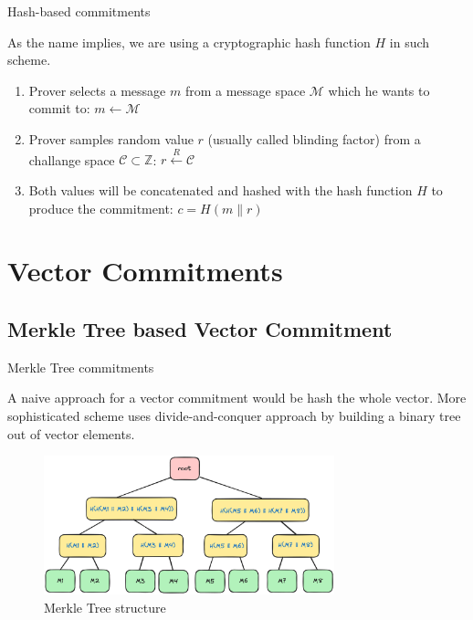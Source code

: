 \documentclass{zkdl-presentation-template}
\begin{document}
    \begin{frame}{Hash-based commitments}

        As the name implies, we are using a cryptographic hash function \(H\) in such scheme.

        \begin{definition}
            \begin{enumerate}
                \item Prover selects a message $m$ from a message space $\mathcal{M}$ which he wants to commit to:
                    $m \leftarrow \mathcal{M}$
            
                \item Prover samples random value $r$ (usually called blinding factor) from a challange space $\mathcal{C} \subset \mathbb{Z}$:
                    $r \xleftarrow{R} \mathcal{C}$
                
                \item Both values will be concatenated and hashed with the hash function $H$ to produce the commitment:
                    $c = H(m \parallel r)$
            \end{enumerate}
        \end{definition}

    \end{frame}

    \section{Vector Commitments}

    \subsection{Merkle Tree based Vector Commitment}

    \begin{frame}{Merkle Tree commitments}

        A naive approach for a vector commitment would be hash the whole vector. 
        More sophisticated scheme uses divide-and-conquer approach by building a binary tree out of vector elements.

        \begin{figure}
            \centering
            \includegraphics[width=0.75\textwidth]{images/lecture_5/MerkleTree.png}
            \caption{Merkle Tree structure}
        \end{figure}

    \end{frame}
\end{document}
